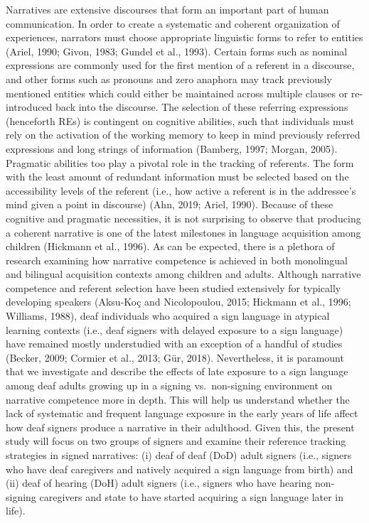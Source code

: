 \documentclass[]{elsarticle} %
\begin{document}
Narratives are extensive discourses that form an important part of human
communication. In order to create a systematic and coherent organization
of experiences, narrators must choose appropriate linguistic forms to
refer to entities (Ariel, 1990; Givon, 1983; Gundel et al., 1993).
Certain forms such as nominal expressions are commonly used for the
first mention of a referent in a discourse, and other forms such as
pronouns and zero anaphora may track previously mentioned entities which
could either be maintained across multiple clauses or re-introduced back
into the discourse. The selection of these referring expressions
(henceforth REs) is contingent on cognitive abilities, such that
individuals must rely on the activation of the working memory to keep in
mind previously referred expressions and long strings of information
(Bamberg, 1997; Morgan, 2005). Pragmatic abilities too play a pivotal
role in the tracking of referents. The form with the least amount of
redundant information must be selected based on the accessibility levels
of the referent (i.e., how active a referent is in the addressee's mind
given a point in discourse) (Ahn, 2019; Ariel, 1990). Because of these
cognitive and pragmatic necessities, it is not surprising to observe
that producing a coherent narrative is one of the latest milestones in
language acquisition among children (Hickmann et al., 1996). As can be
expected, there is a plethora of research examining how narrative
competence is achieved in both monolingual and bilingual acquisition
contexts among children and adults. Although narrative competence and
referent selection have been studied extensively for typically
developing speakers (Aksu-Koç and Nicolopoulou, 2015; Hickmann et al.,
1996; Williams, 1988), deaf individuals who acquired a sign language in
atypical learning contexts (i.e., deaf signers with delayed exposure to
a sign language) have remained mostly understudied with an exception of
a handful of studies (Becker, 2009; Cormier et al., 2013; Gür, 2018).
Nevertheless, it is paramount that we investigate and describe the
effects of late exposure to a sign language among deaf adults growing up
in a signing vs.~non-signing environment on narrative competence more in
depth. This will help us understand whether the lack of systematic and
frequent language exposure in the early years of life affect how deaf
signers produce a narrative in their adulthood. Given this, the present
study will focus on two groups of signers and examine their reference
tracking strategies in signed narratives: (i) deaf of deaf (DoD) adult
signers (i.e., signers who have deaf caregivers and natively acquired a
sign language from birth) and (ii) deaf of hearing (DoH) adult signers
(i.e., signers who have hearing non-signing caregivers and state to have
started acquiring a sign language later in life).
\end{document}
